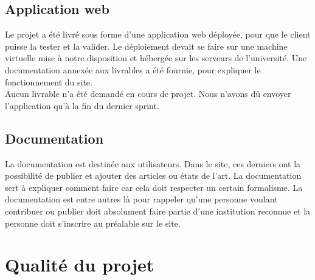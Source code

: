 \documentclass[t, 12pt, usenames,dvipsnames]{article}
\begin{document}
        \subsection{Application web}
            \noindent Le projet a été livré sous forme d'une application web déployée, pour que le client puisse la tester et la valider. Le déploiement devait se faire sur une machine virtuelle mise à notre disposition et hébergée sur les serveurs de l'université. Une documentation annexée aux livrables a été fournie, pour expliquer le fonctionnement du site.\\
            Aucun livrable n'a été demandé en cours de projet. Nous n'avons dû envoyer l'application qu'à la fin du dernier sprint.
        
        \subsection{Documentation}
            \noindent La documentation est destinée aux utilisateurs. Dans le site, ces derniers ont la possibilité de publier et ajouter des articles ou états de l'art. La documentation sert à expliquer comment faire car cela doit respecter un certain formalisme. La documentation est entre autres là pour rappeler qu'une personne voulant contribuer ou publier doit absolument faire partie d'une institution reconnue et la personne doit s'inscrire au préalable sur le site.

    \newpage
    \section{Qualité du projet}
        
\end{document}
